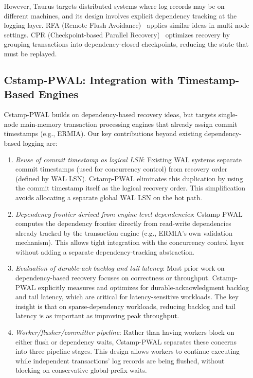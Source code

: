 However, Taurus targets distributed systems where log records may be on different
machines, and its design involves explicit dependency tracking at the logging
layer.  RFA (Remote Flush Avoidance)~\cite{RFA} applies similar ideas in
multi-node settings.  CPR (Checkpoint-based Parallel Recovery)~\cite{CPR}
optimizes recovery by grouping transactions into dependency-closed checkpoints,
reducing the state that must be replayed.

\subsection{Cstamp-PWAL: Integration with Timestamp-Based Engines}

Cstamp-PWAL builds on dependency-based recovery ideas, but targets single-node
main-memory transaction processing engines that already assign commit timestamps
(e.g., ERMIA).  Our key contributions beyond existing dependency-based logging
are:

\begin{enumerate}

\item \emph{Reuse of commit timestamp as logical LSN}: Existing WAL systems
separate commit timestamps (used for concurrency control) from recovery order
(defined by WAL LSN).  Cstamp-PWAL eliminates this duplication by using the
commit timestamp itself as the logical recovery order.  This simplification
avoids allocating a separate global WAL LSN on the hot path.

\item \emph{Dependency frontier derived from engine-level dependencies}:
Cstamp-PWAL computes the dependency frontier directly from read-write
dependencies already tracked by the transaction engine (e.g., ERMIA's own
validation mechanism).  This allows tight integration with the concurrency
control layer without adding a separate dependency-tracking abstraction.

\item \emph{Evaluation of durable-ack backlog and tail latency}: Most prior work
on dependency-based recovery focuses on correctness or throughput.  Cstamp-PWAL
explicitly measures and optimizes for durable-acknowledgment backlog and tail
latency, which are critical for latency-sensitive workloads.  The key insight
is that on sparse-dependency workloads, reducing backlog and tail latency is as
important as improving peak throughput.

\item \emph{Worker/flusher/committer pipeline}: Rather than having workers block
on either flush or dependency waits, Cstamp-PWAL separates these concerns into
three pipeline stages.  This design allows workers to continue executing while
independent transactions' log records are being flushed, without blocking on
conservative global-prefix waits.

\end{enumerate}

